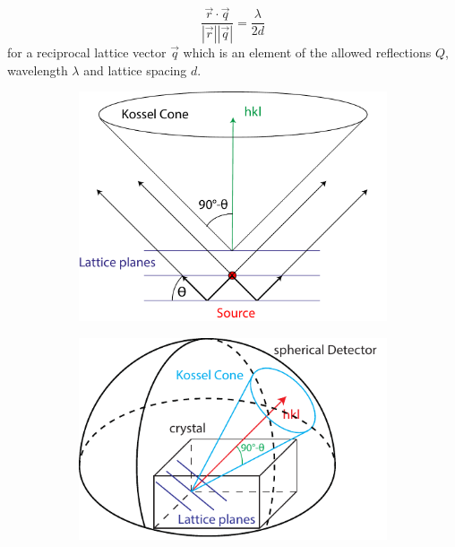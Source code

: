 \begin{equation}
\frac{\vec{r} \cdot \vec{q}}{\left|\vec{r}\right| \left| \vec{q}\right|} = \frac{\lambda}{2d}
\end{equation}
 for a reciprocal lattice vector $\vec{q}$ which is an element of the allowed reflections $Q$, wavelength $\lambda$ and lattice spacing $d$.
\begin{figure}
	\centering
	\begin{subfigure}[b]{0.3\textwidth}
	\includegraphics[width=\linewidth]{images/kossel0.pdf}
	\end{subfigure}
	\begin{subfigure}[b]{0.3\textwidth}
	\includegraphics[width=\linewidth]{images/kossel.pdf}
	\end{subfigure}
	\begin{subfigure}[b]{0.35\textwidth}

\end{subfigure}
\end{figure}
